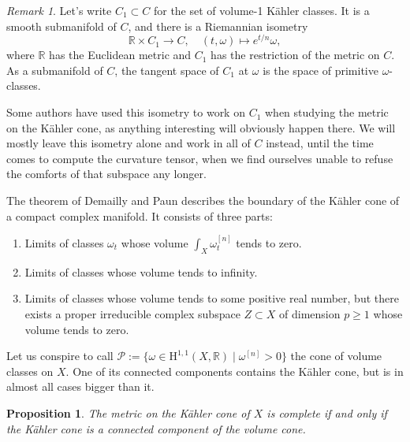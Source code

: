 \documentclass[11pt,a4paper]{amsart}
\newtheorem{prop}[theo]{Proposition}
\theoremstyle{definition}
\theoremstyle{remark}
\newtheorem*{rema}{Remark}
\newcommand{\RR}{\mathbb{R}}
\def\coho#1{\mathrm{H}^{#1}}
\def\kf{\omega}
\def\^#1{^{[#1]}}
\begin{document}
\begin{rema}
Let's write $C_1 \subset C$ for the set of volume-1 K\"{a}hler classes. It is a
smooth submanifold of $C$, and there is a Riemannian isometry
$$
\RR \times C_1 \to C,
\quad
(t, \kf) \mapsto e^{t/n} \kf,
$$
where $\RR$ has the Euclidean metric and $C_1$ has the restriction of the metric
on $C$. As a submanifold of $C$, the tangent space of $C_1$ at $\kf$ is the
space of primitive $\kf$-classes.

Some authors have used this isometry to work on $C_1$ when studying the metric
on the K\"{a}hler cone, as anything interesting will obviously happen there. We will
mostly leave this isometry alone and work in all of $C$ instead, until the time
comes to compute the curvature tensor, when we find ourselves unable to refuse
the comforts of that subspace any longer.
\end{rema}



The theorem of Demailly and Paun describes the boundary of the
K\"{a}hler cone of a compact complex manifold. It consists of three
parts:
\begin{enumerate}
\item Limits of classes $\kf_t$ whose volume $\int_X \kf_t\^n$
tends to zero.
\item Limits of classes whose volume tends to infinity.
\item Limits of classes whose volume tends to some positive real
number, but there exists a proper irreducible complex subspace $Z
\subset X$ of dimension $p \geq 1$ whose volume tends to zero.
\end{enumerate}

Let us conspire to call $\mathcal{P} := \{\kf \in \coho{1,1}(X,\RR) \mid \kf\^n
> 0\}$ the cone of volume classes on $X$. One of its connected components
contains the K\"{a}hler cone, but is in almost all cases bigger than it.

\begin{prop}
\label{prop:fofo}
The metric on the K\"{a}hler cone of $X$ is complete if and only if the
K\"{a}hler cone is a connected component of the volume cone.
\end{prop}
\end{document}
